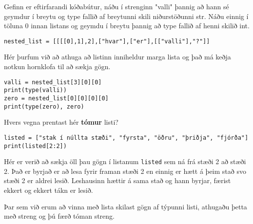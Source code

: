 \begin{exercise}\label{lst4}
	Gefinn er eftirfarandi kóðabútur, náðu í strenginn "valli" þannig að hann sé geymdur í breytu og type fallið af breytunni skili niðurstöðunni str.
	Náðu einnig í töluna 0 innan listans og geymdu í breytu þannig að type fallið af henni skilið int. 
\begin{lstlisting}
nested_list = [[[[0],1],2],["hvar"],["er"],[["valli"],"?"]]\end{lstlisting}
\end{exercise}
\begin{Answer}[ref={lst4}]
Hér þurfum við að athuga að listinn inniheldur marga lista og það má keðja notkun hornklofa til að sækja gögn.
	\begin{lstlisting}
valli = nested_list[3][0][0]
print(type(valli))
zero = nested_list[0][0][0][0]
print(type(zero), zero)\end{lstlisting}
\end{Answer}

\begin{exercise}\label{lst5}
Hvers vegna prentast hér \textbf{tómur} listi? 
\begin{lstlisting}
listed = ["stak í núllta stæði", "fyrsta", "öðru", "þriðja", "fjórða"]
print(listed[2:2])\end{lstlisting}
\end{exercise}
\begin{Answer}[ref={lst5}]
Hér er verið að sækja öll þau gögn í listanum \texttt{listed} sem ná frá stæði 2 að stæði 2.
Það er byrjað er að lesa fyrir framan stæði 2 en einnig er hætt á þeim stað svo stæði 2 er aldrei lesið.
Leshausinn hættir á sama stað og hann byrjar, færist ekkert og ekkert tákn er lesið.

Þar sem við erum að vinna með lista skilast gögn af týpunni listi, athugaðu þetta með streng og þú færð tóman streng.
\end{Answer}

